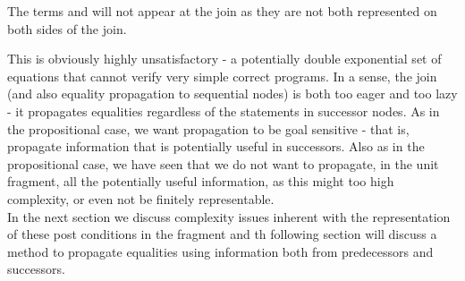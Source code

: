 The terms  and  will not appear at the join as they are not both represented on both sides of the join.

This is obviously highly unsatisfactory - a potentially double exponential set of equations that cannot verify very simple correct programs.
In a sense, the join (and also equality propagation to sequential nodes) is both too eager and too lazy - it propagates equalities regardless of the statements in successor nodes.
As in the propositional case, we want propagation to be goal sensitive - that is, propagate information that is potentially useful in successors. Also as in the propositional case, we have seen that we do not want to propagate, in the unit fragment, all the potentially useful information, as this might too high complexity, or even not be finitely representable.\\
In the next section we discuss complexity issues inherent with the representation of these post conditions in the fragment and th following section will discuss a method to propagate equalities using information both from predecessors and successors.


